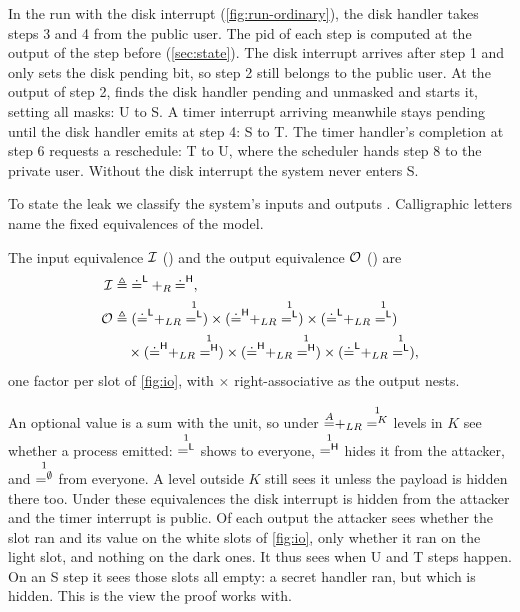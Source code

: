 In the run with the disk interrupt (\cref{fig:run-ordinary}), the disk handler takes
steps 3 and 4 from the public user. The pid of each step is computed at the output of the step before (\cref{sec:state}).
The disk interrupt arrives after step 1 and only sets the disk pending bit, so step 2
still belongs to the public user. At the output of step 2,  finds
the disk handler pending and unmasked and starts it, setting all masks: U to S. A
timer interrupt arriving meanwhile stays pending until the disk handler emits
 at step 4: S to T. The timer handler's completion at step 6 requests a
reschedule: T to U, where the scheduler hands step 8 to the private user. Without the
disk interrupt the system never enters S.


To state the leak we classify the system's inputs  and outputs .
Calligraphic letters name the fixed equivalences of the model.

\medskip
\noindent\begin{minipage}{\linewidth}
\begin{definition}\label{def:io}
The input equivalence $\mathcal{I}$ () and the output equivalence $\mathcal{O}$
() are
\begin{align*}
\Ein &\triangleq \pubeq +_R \priveq, \\
\Eout &\triangleq (\pubeq +_{LR} \one^\Lo) \times (\priveq +_{LR} \one^\Lo) \times (\pubeq +_{LR} \one^\Lo) \\
&\quad{} \times (\priveq +_{LR} \one^\Hi) \times (\priveq +_{LR} \one^\Hi) \times (\pubeq +_{LR} \one^\Lo),
\end{align*}
one factor per slot of \cref{fig:io}, with $\times$ right-associative as the output
nests.
\end{definition}
\end{minipage}
\medskip

An optional value is a sum with the unit, so under $\eqo{A} +_{LR} \one^K$ levels in $K$
see whether a process emitted: $\one^\Lo$ shows  to everyone, $\one^\Hi$
hides it from the attacker, and $\one^\emptyset$ from everyone. A level outside $K$
still sees it unless the payload is hidden there too.
Under these equivalences the disk interrupt is hidden from the attacker and the timer
interrupt is public. Of each output the attacker sees whether the slot ran and its value on the
white slots of \cref{fig:io}, only whether it ran on the light slot, and nothing
on the dark ones.
It thus sees when U and T steps happen. On an S step it sees those slots all empty: a
secret handler ran, but which is hidden. This is the view the proof works with.

